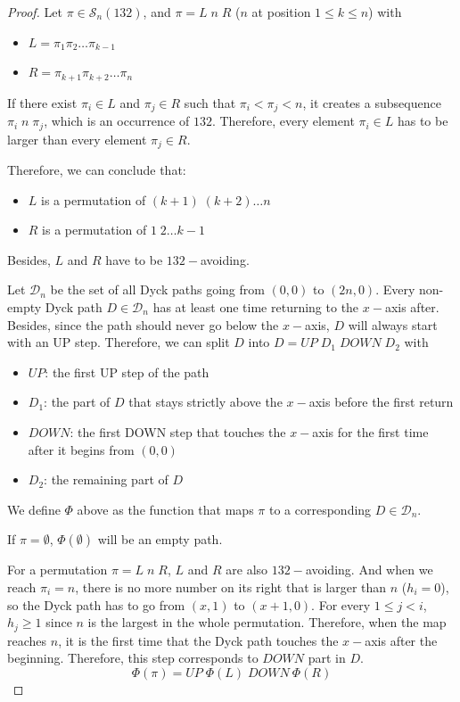 \documentclass[12pt]{article}
\begin{document}
\begin{proof}
Let $\pi \in \mathcal{S}_n(132)$, and $\pi = L\;n\;R$ ($n$ at position $1 \leq k \leq n$) with 
\begin{itemize}
    \item $L = \pi_1\pi_2\ldots\pi_{k-1}$
    \item $R = \pi_{k+1}\pi_{k+2}\ldots\pi_{n}$
\end{itemize}

 If there exist $\pi_i \in L$ and $\pi_j \in R$ such that $\pi_i < \pi_j < n$, it creates a subsequence $\pi_i \;n \;\pi_j$, which is an occurrence of $132$. Therefore, every element $\pi_i \in L$ has to be larger than every element $\pi_j \in R$.

 Therefore, we can conclude that:

 \begin{itemize}
    \item $L$ is a permutation of $(k+1)\;(k+2)\ldots n$
    \item $R$ is a permutation of $1\;2\ldots k-1$
\end{itemize}

Besides, $L$ and $R$ have to be $132-$avoiding.

Let $\mathcal{D}_n$ be the set of all Dyck paths going from $(0,0)$ to $(2n,0)$. Every non-empty Dyck path $D \in \mathcal{D}_n$ has at least one time returning to the $x-$axis after. Besides, since the path should never go below the $x-$axis, $D$ will always start with an UP step. Therefore, we can split $D$ into $D = UP\;D_1\;DOWN\;D_2$ with

\begin{itemize}
    \item $UP$: the first UP step of the path
    \item $D_1$: the part of $D$ that stays strictly above the $x-$axis before the first return
    \item $DOWN$: the first DOWN step that touches the $x-$axis for the first time after it begins from $(0,0)$
    \item $D_2$: the remaining part of $D$
\end{itemize}

We define $\Phi$ above as the function that maps $\pi$ to a corresponding $D \in \mathcal{D}_n$. 

If $\pi=\emptyset$, $\Phi(\emptyset)$ will be an empty path. 

For a permutation $\pi = L \; n \; R$, $L$ and $R$ are also $132-$avoiding. And when we reach $\pi_i=n$, there is no more number on its right that is larger than $n$ ($h_i=0$), so the Dyck path has to go from $(x,1)$ to $(x+1,0)$. For every $1 \leq j < i$, $h_j \geq 1$ since $n$ is the largest in the whole permutation. Therefore, when the map reaches $n$, it is the first time that the Dyck path touches the $x-$axis after the beginning. Therefore, this step corresponds to $DOWN$ part in $D$. 
$$ \Phi(\pi) = UP \;\Phi(L) \;DOWN \ \Phi(R)$$


\end{proof}
\end{document}
